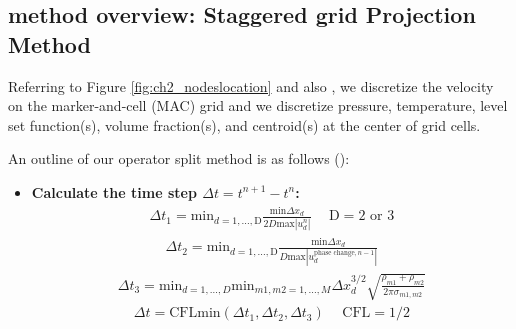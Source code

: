 \documentclass[]{article}
\begin{document}
\subsection{method overview: Staggered grid Projection Method}

Referring to Figure \ref{fig:ch2_nodeslocation} and also 
\cite{pei2019hierarchical,VAHAB2021}, 
we discretize the velocity on the marker-and-cell (MAC) grid and we
discretize pressure, temperature, level set function(s), volume fraction(s),
and centroid(s) at the center of grid cells.

An outline of our operator split method is as 
follows 
(\cite{VAHAB2021}):
\begin{itemize}
\item \textbf{Calculate the time step $\Delta t=t^{n+1}-t^{n}$:}
  \begin{eqnarray*}
  \Delta t_{1}=\mbox{min}_{d=1,\ldots,\mbox{D}}
    \frac{\mbox{min}\Delta x_{d}}{2 D \mbox{max}|u_{d}^{n}|} 
    \hspace{15pt} \mbox{D}=2\mbox{ or }3
  \end{eqnarray*}
  \begin{eqnarray*}
  \Delta t_{2}=
    \mbox{min}_{d=1,\ldots,\mbox{D}}
    \frac{\mbox{min}\Delta x_{d}}{D\mbox{max}
    |u_{d}^{\mbox{phase change},n-1}|} 
  \end{eqnarray*}
  \begin{eqnarray}
  \Delta t_{3}=
  \mbox{min}_{d=1,\ldots,D}
  \mbox{min}_{m1,m2=1,\ldots,M}
    \Delta x_{d}^{3/2}
    \sqrt{\frac{\rho_{m1}+\rho_{m2}}
          {2\pi\sigma_{m1,m2}}} 
    \label{stiffconstraint}
  \end{eqnarray}
  \begin{eqnarray*}
  \Delta t=\mbox{CFL}\mbox{min}(
    \Delta t_{1},
    \Delta t_{2},
    \Delta t_{3}) \hspace{15pt} \mbox{CFL}=1/2
  \end{eqnarray*}
  

\end{itemize}
\end{document}
